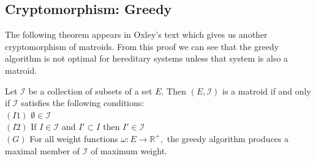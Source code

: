 \documentclass[../main.tex]{subfiles}
\begin{document}
\subsection{Cryptomorphism: Greedy}
The following theorem appears in Oxley's text\cite{ox_book} which gives us another cryptomorphism of matroids. From this proof we can see that the greedy algorithm is not optimal for hereditary systems unless that system is also a matroid.
\begin{thm}
Let $\mathcal{I}$ be a collection of subsets of a set $E.$ Then $(E,\mathcal{I})$ is a matroid if and only if $\mathcal{I}$ satisfies the following conditions:\\
$(I1)$ $\emptyset \in \mathcal{I}$\\
$(I2)$ If $I \in \mathcal{I}$ and $I' \subset I$ then $I' \in \mathcal{I}$\\
$(G)$ For all weight functions $\omega:E \longrightarrow \mathbb{R^+},$ the greedy algorithm produces a maximal member of $\mathcal{I}$ of maximum weight.
\end{thm}
\end{document}
